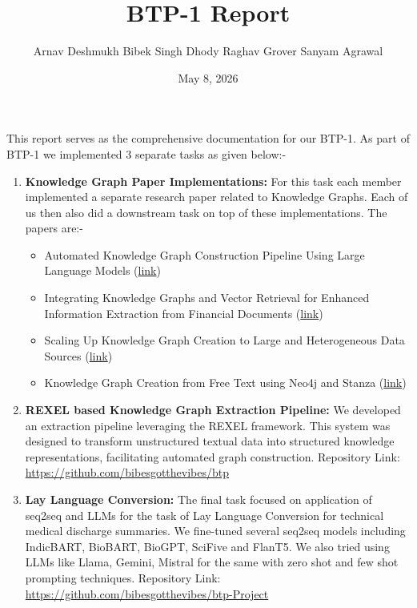 \documentclass[12pt]{article}
\title{BTP-1 Report}
\author{Arnav Deshmukh \quad Bibek Singh Dhody \quad Raghav Grover \quad Sanyam Agrawal}
\date{May 8, 2026}
\begin{document}
\maketitle

\vspace{2em}


\vspace{1.5em}

\noindent This report serves as the comprehensive documentation for our BTP-1. As part of BTP-1 we implemented 3 separate tasks as given below:-

\begin{enumerate}[label=\textbf{Task \arabic*:}, leftmargin=2cm]
    \item \textbf{Knowledge Graph Paper Implementations:} For this task each member implemented a separate research paper related to Knowledge Graphs. Each of us then also did a downstream task on top of these implementations. The papers are:-
    \begin{itemize}
        \item Automated Knowledge Graph Construction Pipeline Using Large Language Models (\href{https://arxiv.org/pdf/2403.08345}{link})
        \item Integrating Knowledge Graphs and Vector Retrieval for Enhanced Information Extraction from Financial Documents (\href{https://dl.acm.org/doi/pdf/10.1145/3677052.3698671}{link})
        \item Scaling Up Knowledge Graph Creation to Large and Heterogeneous Data Sources (\href{https://www.sciencedirect.com/science/article/abs/pii/S1570826822000397}{link})
        \item Knowledge Graph Creation from Free Text using Neo4j and Stanza (\href{https://dl.acm.org/doi/10.1145/3716554.3716624}{link})
    \end{itemize}
    \item \textbf{REXEL based Knowledge Graph Extraction Pipeline:} We developed an extraction pipeline leveraging the REXEL framework. This system was designed to transform unstructured textual data into structured knowledge representations, facilitating automated graph construction. Repository Link: \url{https://github.com/bibesgotthevibes/btp}
    \item \textbf{Lay Language Conversion:} The final task focused on application of seq2seq and LLMs for the task of Lay Language Conversion for technical medical discharge summaries. We fine-tuned several seq2seq models including IndicBART, BioBART, BioGPT, SciFive and FlanT5. We also tried using LLMs like Llama, Gemini, Mistral for the same with zero shot and few shot prompting techniques. Repository Link: \url{https://github.com/bibesgotthevibes/btp-Project}
\end{enumerate}
\end{document}
